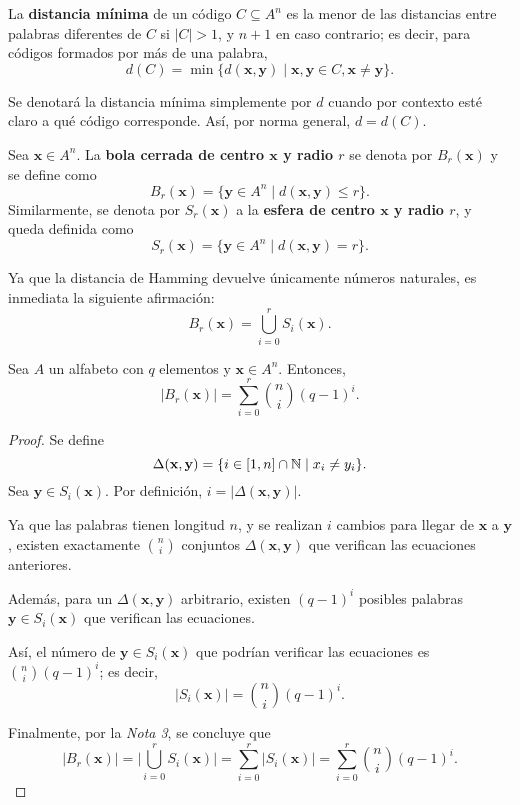 \begin{definition}
	La \textbf{distancia mínima} de un código $C \subseteq A^n$ es la menor de las distancias entre palabras diferentes de $C$ si $|C| > 1$, y $n+1$ en caso contrario; es decir, para códigos formados por más de una palabra,
	\[d(C) = \min\{d(\textbf{x}, \textbf{y}) \mid \textbf{x}, \textbf{y} \in C, \textbf{x}\neq\textbf{y}\}.\]
	
	\begin{remark}
		Se denotará la distancia mínima simplemente por $d$ cuando por contexto esté claro a qué código corresponde. Así, por norma general, $d = d(C)$.
	\end{remark}
\end{definition}

\begin{definition}
	Sea $\textbf{x} \in A^n$. La \textbf{bola cerrada de centro $\textbf{x}$ y radio $r$} se denota por $B_r(\textbf{x})$ y se define como
	\[B_r(\textbf{x}) = \{\textbf{y} \in A^n \mid d(\textbf{x}, \textbf{y}) \leq r\}.\]
	Similarmente, se denota por $S_r(\textbf{x})$ a la \textbf{esfera de centro $\textbf{x}$ y radio $r$}, y queda definida como
	\[S_r(\textbf{x}) = \{\textbf{y} \in A^n \mid d(\textbf{x}, \textbf{y}) = r\}.\]
	\begin{remark}
		Ya que la distancia de Hamming devuelve únicamente números naturales, es inmediata la siguiente afirmación:
		\[B_r(\textbf{x}) = \bigcup_{i=0}^r S_i(\textbf{x}).\]
	\end{remark}
\end{definition}

\begin{theorem}
	Sea $A$ un alfabeto con $q$ elementos y $\textbf{x} \in A^n$. Entonces,
	\[|B_r(\textbf{x})| = \sum_{i=0}^r\binom{n}{i}(q - 1)^i.\]
\end{theorem}

\begin{proof}
	Se define
	\[\Delta(\textbf{x}, \textbf{y}) = \{i\in[1,n]\cap\mathbb{N} \mid x_i \neq y_i\}.\]
	Sea $\textbf{y} \in S_i(\textbf{x})$. Por definición, $i = |\Delta(\textbf{x}, \textbf{y})|$.
	
	Ya que las palabras tienen longitud $n$, y se realizan $i$ cambios para llegar de $\textbf{x}$ a $\textbf{y}$, existen exactamente $\binom{n}{i}$ conjuntos $\Delta(\textbf{x}, \textbf{y})$ que verifican las ecuaciones anteriores.
	
	Además, para un $\Delta(\textbf{x}, \textbf{y})$ arbitrario, existen $(q - 1)^i$ posibles palabras $\textbf{y} \in S_i(\textbf{x})$ que verifican las ecuaciones.
	
	Así, el número de $\textbf{y} \in S_i(\textbf{x})$ que podrían verificar las ecuaciones es $\displaystyle{\binom{n}{i}(q - 1)^i}$; es decir,
	\[|S_i(\textbf{x})| = \binom{n}{i}(q - 1)^i.\]
	
	Finalmente, por la \textit{Nota 3}, se concluye que
	\[|B_r(\textbf{x})| = \bigg|\bigcup_{i=0}^r S_i(\textbf{x})\bigg| = \sum_{i=0}^r |S_i(\textbf{x})| = \sum_{i=0}^r\binom{n}{i}(q - 1)^i.\]
\end{proof}

